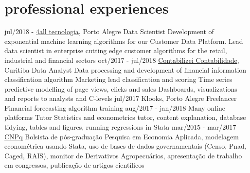 \documentclass[]{friggeri-cv}
\begin{document}
\section{professional experiences}

\begin{entrylist}
  \entry
    {jul/2018 - }
    {\href{https://www.4all.com/}{4all tecnologia}, Porto Alegre}
    {Data Scientist}
    {Development of exponential machine learning algorithms for our Customer Data Platform.
    Lead data scientist in enterprise cutting edge customer algorithms for the retail, industrial and financial sectors}
  \entry
    {oct/2017 - jul/2018}
    {\href{https://www.contabilizei.com.br}{Contabilizei Contabilidade}, Curitiba}
    {Data Analyst}
    {Data processing and development of financial information classification algorithm
    Marketing lead classification and scoring
    Time series predictive modelling of page views, clicks and sales
    Dashboards, visualizations and reports to analysts and C-levels}
  \entry
    {jul/2017}
    {Klooks, Porto Alegre}
    {Freelancer}
    {Financial forecasting algorithm training}
  \entry
    {aug/2017 - jan/2018}
    {Many online platforms}
    {Tutor}
    {Statistics and econometrics tutor, content explanation, database tidying, tables and figures, running regressions in Stata}
  \entry
    {mar/2015 - mar/2017}
    {\href{cnpq.br}{CNPq}}
    {Bolsista de pós-graduação}
    {Pesquisa em Economia Aplicada, modelagem econométrica usando Stata, uso de bases de dados governamentais (Censo, Pnad, Caged, RAIS), monitor de Derivativos Agropecuários, apresentação de trabalho em congressos, publicação de artigos científicos}
\end{entrylist}
\end{document}
